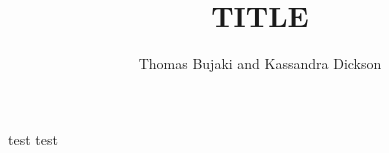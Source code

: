 \documentclass[]{report}
\title{TITLE}
\author{Thomas Bujaki and Kassandra Dickson}
\date{\parbox{\linewidth}{\centering%
		\today\endgraf\bigskip
		Directed Studies\endgraf\medskip
		Department of Biology\endgraf
		Carleton University}}
\begin{document}
	
	\maketitle
	\renewcommand{\thechapter}{\roman{chapter}}
	\cleardoublepage
	\setcounter{chapter}{1}
	\renewcommand{\thechapter}{\arabic{chapter}}
	
\noindent
test test
\end{document}
